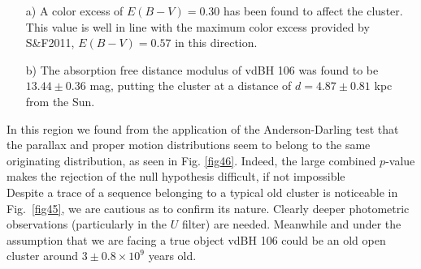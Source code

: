 \documentclass[referee]{aa}
\begin{document}
\begin{itemize}
\item [a)] A color excess of $E(B-V)=0.30$ has been found to affect the
cluster. This value is well in line with the maximum color excess provided
by S\&F2011, $E(B-V)=0.57$ in this direction.
\item [b)] The absorption free distance modulus of vdBH 106 was found to be
$13.44\pm0.36$ mag, putting the cluster at a distance of
$d=4.87\pm0.81$ kpc from the Sun.
\end{itemize}

In this region we found from the application of the Anderson-Darling test that
the parallax and proper motion distributions seem to belong to the same
originating distribution, as seen in Fig. \ref{fig46}. Indeed, the
large combined $p$-value makes the rejection of the null hypothesis difficult,
if not impossible\\

Despite a trace of a sequence belonging to a typical old cluster is
noticeable in Fig.~\ref{fig45}, we are cautious as to confirm its nature.
Clearly deeper photometric observations (particularly in the $U$ filter) are
needed. Meanwhile and under the assumption that we are facing a true object
vdBH 106 could be an old open cluster around $3\pm0.8\times10^9$ years
old.
\end{document}
